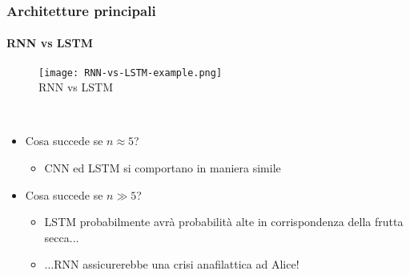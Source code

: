 %
\begin{frame}[t] \frametitle{Architetture principali}
\framesubtitle{RNN vs LSTM}
{\scriptsize
{}
	\begin{minipage}[t]{\textwidth}
		\begin{figure}
			\centering
			\texttt{[image: RNN-vs-LSTM-example.png]}
			\\RNN vs LSTM
		\end{figure}
	\end{minipage}
	\\\vspace*{.3cm}
	\begin{minipage}[t]{\textwidth}
		\begin{itemize}[leftmargin=10pt,align=right]
			\onslide<2->\item[\alert{\faArrowCircleRight}] Cosa succede se $n \approx 5$?
			\begin{itemize}[leftmargin=10pt,align=right]
				\onslide<3->\item[\alert{\faArrowCircleRight}] CNN ed LSTM si comportano in maniera simile
			\end{itemize}
			\item[\alert{\faArrowCircleRight}] Cosa succede se $n \gg 5$?
			\begin{itemize}[leftmargin=10pt,align=right]
				\onslide<5->\item[\alert{\faArrowCircleRight}] LSTM probabilmente avrà probabilità alte in corrispondenza della frutta secca$\ldots$
				\onslide<6->\item[\alert{\faArrowCircleRight}] $\ldots$RNN assicurerebbe una crisi anafilattica ad Alice!
			\end{itemize}
		\end{itemize}
	\end{minipage}
}
\end{frame}
%
